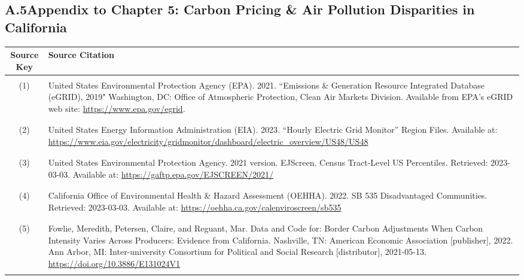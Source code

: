 \newpage
\subsection*{A.5\quad Appendix to Chapter 5: Carbon Pricing \& Air Pollution Disparities in California}

\begin{center}
    \singlespacing
    \renewcommand{\arraystretch}{1.5}
    \small
    \begin{longtable}{c L{0.8\textwidth}}
        \hline\hline
        Source Key & Source Citation\\
        \hline \\[-3ex]
        (1) & United States Environmental Protection Agency (EPA). 2021. ``Emissions \& Generation Resource Integrated Database (eGRID), 2019" Washington, DC: Office of Atmospheric Protection, Clean Air Markets Division. Available from EPA's eGRID web site: \url{https://www.epa.gov/egrid}.\\ \\[-3ex]
        \hline \\[-3ex]
        (2) & United States Energy Information Administration (EIA). 2023. ``Hourly Electric Grid Monitor'' Region Files. Available at: \url{https://www.eia.gov/electricity/gridmonitor/dashboard/electric_overview/US48/US48}\\ \\[-3ex]
        \hline \\[-3ex]
        (3) & United States Environmental Protection Agency. 2021 version. EJScreen. Census Tract-Level US Percentiles. Retrieved: 2023-03-03. Available at: \url{https://gaftp.epa.gov/EJSCREEN/2021/} \\ \\[-3ex]
        \hline \\[-3ex]
        (4) & California Office of Environmental Health \& Hazard Assessment (OEHHA). 2022. SB 535 Disadvantaged Communities. Retrieved: 2023-03-03. Available at: \url{https://oehha.ca.gov/calenviroscreen/sb535} \\ \\[-3ex]
        \hline \\[-3ex]
        (5) & Fowlie, Meredith, Petersen, Claire, and Reguant, Mar. Data and Code for: Border Carbon Adjustments When Carbon Intensity Varies Across Producers: Evidence from California. Nashville, TN: American Economic Association [publisher], 2022. Ann Arbor, MI: Inter-university Consortium for Political and Social Research [distributor], 2021-05-13. \url{https://doi.org/10.3886/E131024V1} \\ \\[-3ex]

\end{longtable}
\end{center}

